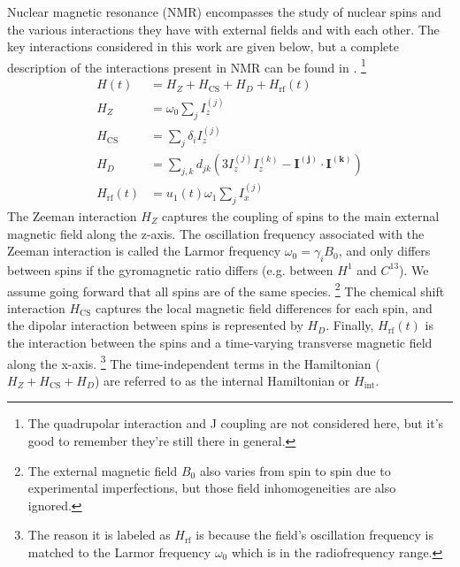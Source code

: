 Nuclear magnetic resonance (NMR) encompasses the study of nuclear spins and the various interactions they have with external fields and with each other.
The key interactions considered in this work are given below, but a complete description of the interactions present in NMR can be found in \cite{1976ii}.%
\footnote{The quadrupolar interaction and J coupling are not considered here, but it's good to remember they're still there in general.}
\begin{align}\label{eq:nmr-ham}
    H(t) &= H_Z + H_\text{CS} + H_D + H_\text{rf}(t) \\
    H_Z &= \omega_0 \sum_j I_z^{(j)} \\
    H_\text{CS} &= \sum_j \delta_i I_z^{(j)} \\
    H_D &= \sum_{j,k} d_{jk} \left( 3I_z^{(j)}I_z^{(k)} - \mathbf{I^{(j)}} \cdot \mathbf{I^{(k)}} \right) \\
    \label{eq:nmr-ham-rf}
    H_{\text{rf}}(t) &=  u_1(t) \omega_1 \sum_j I_x^{(j)}
\end{align}
The Zeeman interaction $H_Z$ captures the coupling of spins to the main external magnetic field along the z-axis. The oscillation frequency associated with the Zeeman interaction is called the Larmor frequency $\omega_0 = \gamma_i B_0$, and only differs between spins if the gyromagnetic ratio differs (e.g. between $H^1$ and $C^{13}$). We assume going forward that all spins are of the same species.%
\footnote{The external magnetic field $B_0$ also varies from spin to spin due to experimental imperfections, but those field inhomogeneities are also ignored.}
The chemical shift interaction $H_{\text{CS}}$ captures the local magnetic field differences for each spin, and the dipolar interaction between spins is represented by $H_D$. Finally, $H_\text{rf}(t)$ is the interaction between the spins and a time-varying transverse magnetic field along the x-axis.%
\footnote{The reason it is labeled as $H_\text{rf}$ is because the field's oscillation frequency is matched to the Larmor frequency $\omega_0$ which is in the radiofrequency range.}
The time-independent terms in the Hamiltonian ($H_Z + H_{\text{CS}} + H_D$) are referred to as the internal Hamiltonian or $H_{\text{int}}$.



